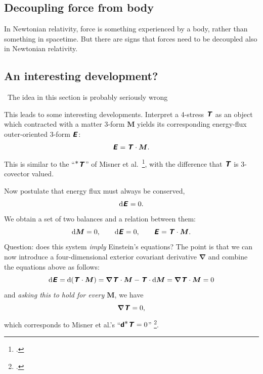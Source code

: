 \documentclass[\ifafour a4paper,12pt,\else a5paper,10pt,\fi%
onecolumn,oneside,article,%
british%
]{memoir}
\theoremstyle{remark}
\theoremstyle{innote}
\newcommand*{\mathte}[1]{\textbf{\textit{\textsf{#1}}}}
\newcommand*{\citep}{\footcites}
\newcommand*{\di}{\mathrm{d}}%
\renewcommand*{\|}[1][]{\nonscript\,#1\vert\nonscript\;\mathopen{}}
\newcommand*{\chap}{ch.}%
\newcommand*{\etal}{{et al.}}
\newcommand*{\puzzle}{{\fontencoding{U}\fontfamily{fontawesometwo}\selectfont\symbol{225}}}
\newcommand{\mynote}[1]{ {\color{notecolour}\puzzle\ #1}}
\newcommand*{\yrr}{M}
\newcommand*{\yr}{\bm{\yrr}}
\newcommand*{\yEE}{E}
\newcommand*{\yE}{\mathte{\yEE}}
\newcommand*{\yTTf}{T}
\newcommand*{\yTf}{\mathte{\yTTf}}
\newcommand*{\yDi}{\bm{\nabla}}
\begin{document}
\subsection{Decoupling force from body}
\label{sec:decoupling_force_body}

In Newtonian relativity, force is something experienced by a body, rather
than something in spacetime. But there are signs that forces need to be
decoupled also in Newtonian relativity.


\subsection{An interesting development?}
\label{sec:interesting_development}

\mynote{The idea in this section is probably seriously wrong}

This leads to some interesting developments. Interpret a 4-stress $\yTf$ as
an object which contracted with a matter 3-form $\yr$ yields its
corresponding energy-flux outer-oriented 3-form $\yE$:
\begin{equation}
  \label{eq:stress-matter-momentum}
  \yE = \yTf \cdot \yr.
\end{equation}
This is similar to the \enquote{$^{\displaystyle *}\yTf$} of Misner \etal\
\citep[\chap~15]{misneretal1970_r1973}, with the difference that $\yTf$ is
3-covector valued.

Now postulate that energy flux must always be conserved,
\begin{equation}
  \label{eq:conserv_energy-momentum_try}
  \di\yE = 0.
\end{equation}
We obtain a set of two balances and a relation between them:
\begin{equation}
  \label{eq:massb_energyb_relation}
  \di\yr = 0, \qquad \di\yE = 0, \qquad \yE = \yTf \cdot \yr.
\end{equation}
Question: does this system \emph{imply} Einstein's equations? The point
is that we can now introduce a four-dimensional exterior covariant
derivative $\yDi$ and combine the  equations above as follows:
\begin{equation}
  \label{eq:why_4stress_zero}
     \di\yE
    = \di(\yTf \cdot \yr) 
    = \yDi\yTf \cdot \yr - \yTf \cdot \di\yr
   = \yDi\yTf \cdot \yr
    = 0
\end{equation}
and \emph{asking this to hold for every $\yr$}, we have
\begin{equation}
  \label{eq:div_T_vanishes}
  \yDi\yTf = 0,
\end{equation}
which corresponds to Misner \etal's
\enquote{$\bm{\mathsf{d}}{}^{\displaystyle *}\yTf=0$}
\citep[\chap~15]{misneretal1970_r1973}.
\end{document}

